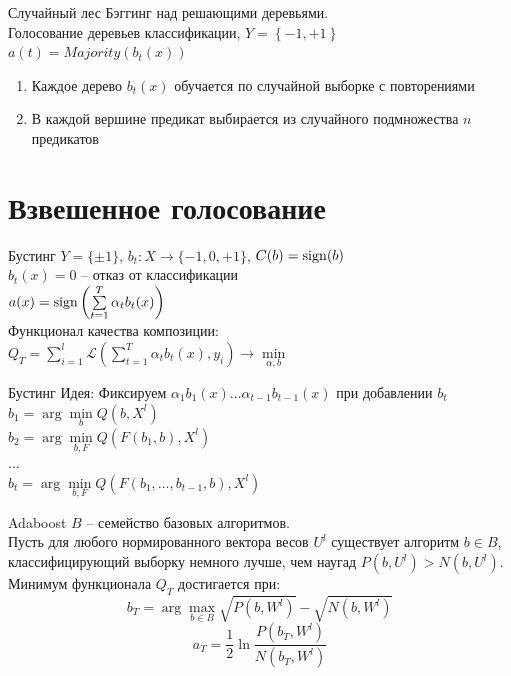 \documentclass[10pt]{beamer}
\begin{document}
{
\begin{frame}{Случайный лес}
  Бэггинг над решающими деревьями.\\
  \bigbreak
	Голосование деревьев классификации, $Y = \left\{ -1, +1 \right\}$\\
	$a(t) = Majority(b_t(x))$%
	\begin{enumerate}[--]
  	  \item Каждое дерево $b_t(x)$ обучается по случайной выборке с повторениями
	  \item В каждой вершине предикат выбирается из случайного подмножества $n$ предикатов
	\end{enumerate}
\end{frame}
}

\section{Взвешенное голосование}

{
\begin{frame}{Бустинг}
  $Y = \{\pm 1\}$, \qquad $b_t: X\rightarrow \{-1, 0, +1\}$, \qquad $C(b) = \operatorname{sign}(b)$\\
  $b_t(x) = 0$ -- отказ от классификации\\
  \bigbreak
  \pause
  $a(x) = \operatorname{sign}\left(\sum\limits_{t=1}^{T} \alpha_t b_t(x)\right)$\\
  \bigbreak
  Функционал качества композиции:\\
  $Q_T = \sum\limits_{i=1}^l \mathcal{L}(\sum\limits_{t=1}^{T} \alpha_t b_t(x), y_i) \rightarrow \min\limits_{\alpha, b}$
\end{frame}
}

{
\begin{frame}{Бустинг}
  \alert{Идея}: Фиксируем $\alpha_1 b_1(x) \dots \alpha_{t-1} b_{t-1}(x)$ при добавлении $b_t$
  \bigbreak
  \pause
  $b_1 = \arg\min\limits_{b} Q(b, X^l)$\\
  $b_2 = \arg\min\limits_{b, F} Q(F(b_1, b), X^l)$\\
  $\dots$\\
  $b_t = \arg\min\limits_{b, F} Q(F(b_1, \dots, b_{t-1}, b), X^l)$
\end{frame}
}

\begin{frame}{Adaboost}
  $B$ -- семейство базовых алгоритмов.\\
  \bigbreak
  Пусть для любого нормированного вектора весов $U^l$ существует алгоритм $b \in B$, классифицирующий выборку немного лучше, чем наугад $P(b, U^l) > N (b, U^l)$. 
  Минимум функционала $Q_T$ достигается при:\\
  $$b_T = \arg\max\limits_{b \in B} \sqrt{P(b, W^l)} - \sqrt{N(b, W^l)}$$
  $$a_T = \frac{1}{2} \ln \frac{P(b_T, W^l)}{N(b_T, W^l)}$$
\end{frame}
\end{document}
